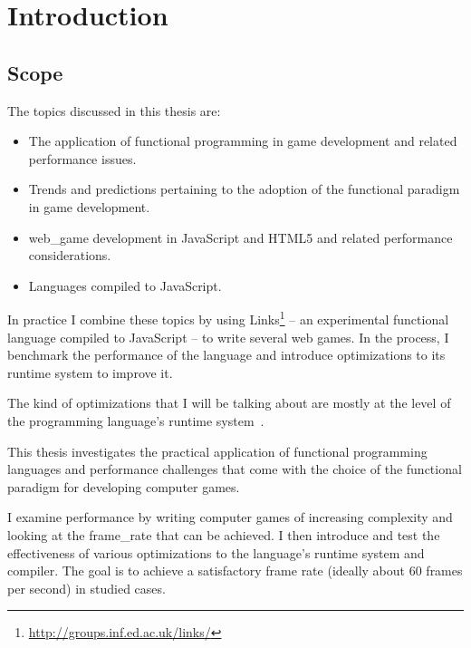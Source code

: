 \chapter{Introduction}\label{chap:intro}
\section{Scope}
The topics discussed in this thesis are:
\begin{itemize}
\item The application of functional programming in game development and related performance issues.
\item Trends and predictions pertaining to the adoption of the functional paradigm in game development.
\item \Gls{web_game} development in JavaScript and HTML5 and related performance considerations.
\item Languages compiled to JavaScript.
\end{itemize}
In practice I combine these topics by using Links\footnote{\url{http://groups.inf.ed.ac.uk/links/}} -- an experimental functional language compiled to JavaScript -- to write several web games. In the process, I benchmark the performance of the language and introduce optimizations to its runtime system to improve it.

The kind of optimizations that I will be talking about are mostly at the level of the programming language's runtime system~\cite{appel}.


This thesis investigates the practical application of functional programming languages and performance challenges that come with the choice of the functional paradigm for developing computer games.

I examine performance by writing computer games of increasing complexity and looking at the \gls{frame_rate} that can be achieved. I then introduce and test the effectiveness of various optimizations to the language's runtime system and compiler. The goal is to achieve a satisfactory frame rate (ideally about 60 frames per second) in studied cases.

